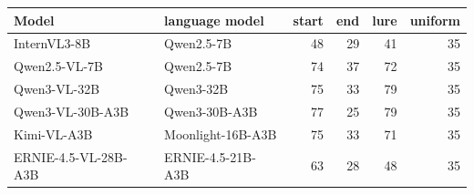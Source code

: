 \begin{tabular}{llrrrr}
\toprule
Model & language model & start & end & lure & uniform \\
\midrule
InternVL3-8B & Qwen2.5-7B & 48 & 29 & 41 & 35 \\
Qwen2.5-VL-7B & Qwen2.5-7B & 74 & 37 & 72 & 35 \\
Qwen3-VL-32B & Qwen3-32B & 75 & 33 & 79 & 35 \\
Qwen3-VL-30B-A3B & Qwen3-30B-A3B & 77 & 25 & 79 & 35 \\
Kimi-VL-A3B & Moonlight-16B-A3B & 75 & 33 & 71 & 35 \\
ERNIE-4.5-VL-28B-A3B & ERNIE-4.5-21B-A3B & 63 & 28 & 48 & 35 \\
\bottomrule
\end{tabular}

